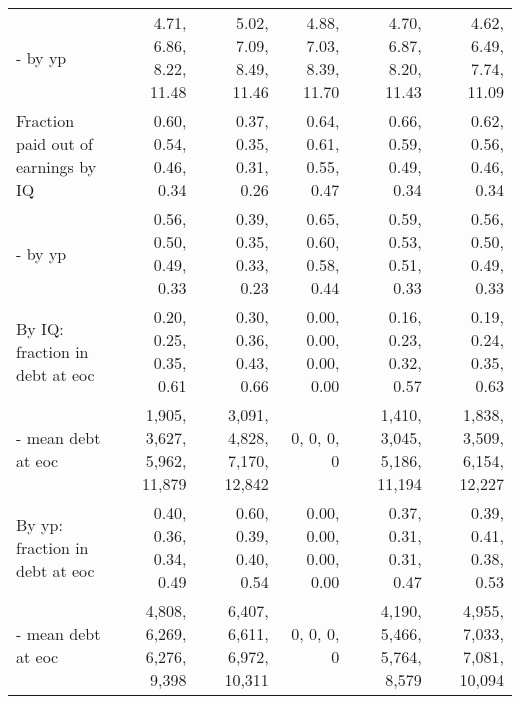 \begin{tabular}{lrrrrr}
- by yp & 4.71, 6.86, 8.22, 11.48  & 5.02, 7.09, 8.49, 11.46  & 4.88, 7.03, 8.39, 11.70  & 4.70, 6.87, 8.20, 11.43  & 4.62, 6.49, 7.74, 11.09  \\ 
Fraction paid out of earnings by IQ & 0.60, 0.54, 0.46, 0.34  & 0.37, 0.35, 0.31, 0.26  & 0.64, 0.61, 0.55, 0.47  & 0.66, 0.59, 0.49, 0.34  & 0.62, 0.56, 0.46, 0.34  \\ 
- by yp & 0.56, 0.50, 0.49, 0.33  & 0.39, 0.35, 0.33, 0.23  & 0.65, 0.60, 0.58, 0.44  & 0.59, 0.53, 0.51, 0.33  & 0.56, 0.50, 0.49, 0.33  \\ 
By IQ: fraction in debt at eoc & 0.20, 0.25, 0.35, 0.61  & 0.30, 0.36, 0.43, 0.66  & 0.00, 0.00, 0.00, 0.00  & 0.16, 0.23, 0.32, 0.57  & 0.19, 0.24, 0.35, 0.63  \\ 
- mean debt at eoc & 1,905, 3,627, 5,962, 11,879  & 3,091, 4,828, 7,170, 12,842  & 0, 0, 0, 0  & 1,410, 3,045, 5,186, 11,194  & 1,838, 3,509, 6,154, 12,227  \\ 
By yp: fraction in debt at eoc & 0.40, 0.36, 0.34, 0.49  & 0.60, 0.39, 0.40, 0.54  & 0.00, 0.00, 0.00, 0.00  & 0.37, 0.31, 0.31, 0.47  & 0.39, 0.41, 0.38, 0.53  \\ 
- mean debt at eoc & 4,808, 6,269, 6,276, 9,398  & 6,407, 6,611, 6,972, 10,311  & 0, 0, 0, 0  & 4,190, 5,466, 5,764, 8,579  & 4,955, 7,033, 7,081, 10,094  \\ 
\hline
\end{tabular}%
